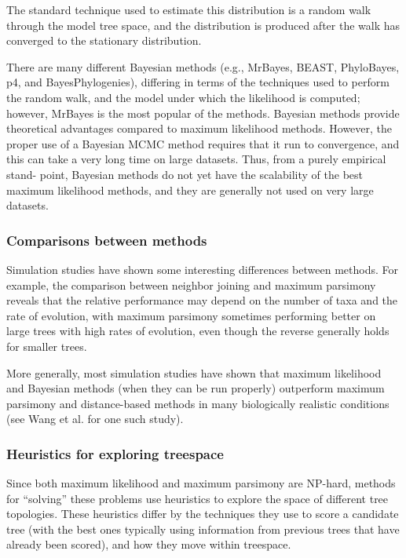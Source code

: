 The standard technique used to estimate this distribution 
is a random walk through the model tree space, and the 
distribution is produced after the walk has converged to 
the stationary distribution.

There are many different Bayesian methods (e.g., MrBayes, BEAST, 
PhyloBayes, p4, and BayesPhylogenies), differing in terms 
of the techniques used to perform the random walk, and 
the model under which the likelihood is computed; however, 
MrBayes is the most popular of the methods. Bayesian 
methods provide theoretical advantages compared to 
maximum likelihood methods. However, the proper use of a 
Bayesian MCMC method requires that it run to convergence, 
and this can take a very long time on large datasets. 
Thus, from a purely empirical stand- point, Bayesian 
methods do not yet have the scalability of the best 
maximum likelihood methods, and they are generally 
not used on very large datasets.

\subsubsection{Comparisons between methods}
Simulation studies have shown some interesting 
differences between methods. For example, the 
comparison between neighbor joining and maximum 
parsimony reveals that the relative performance may 
depend on the number of taxa and the rate of evolution, 
with maximum parsimony sometimes performing better 
on large trees with high rates of evolution, even 
though the reverse generally holds for smaller trees.  

More generally, most simulation studies have shown 
that maximum likelihood and Bayesian methods 
(when they can be run properly) outperform maximum 
parsimony and distance-based methods in many 
biologically realistic conditions 
(see Wang et al. for one such study).

\subsubsection{Heuristics for exploring treespace}
Since both maximum likelihood and maximum parsimony 
are NP-hard, methods for ``solving'' these problems 
use heuristics to explore the space of different tree 
topologies. These heuristics differ by the techniques 
they use to score a candidate tree (with the best 
ones typically using information from previous 
trees that have already been scored), and how 
they move within treespace. 
 

\newpage